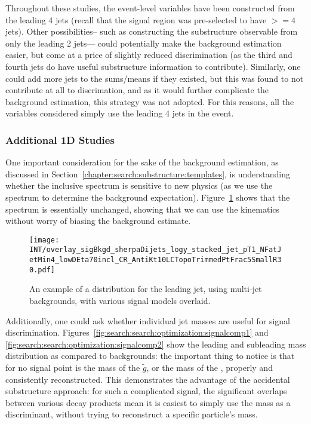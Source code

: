 Throughout these studies, the event-level variables have been constructed from the leading 4 jets (recall that the signal region was pre-selected to have $>=4$ jets). Other possibilities-- such as constructing the substructure observable from only the leading 2 jets--- could potentially make the background estimation easier, but come at a price of slightly reduced discrimination (as the third and fourth jets do have useful substructure information to contribute). Similarly, one could add more jets to the sums/means if they existed, but this was found to not contribute at all to discrimation, and as it would further complicate the background estimation, this strategy was not adopted. For this reasons, all the variables considered simply use the leading 4 jets in the event.

\subsubsection{Additional 1D Studies}

One important consideration for the sake of the background estimation, as discussed in Section~\ref{chapter:search:substructure:templates}, is understanding whether the inclusive \pt spectrum is sensitive to new physics (as we use the \pt spectrum to determine the background expectation). Figure~\ref{fig:search:search:optimization:pt} shows that the \pt spectrum is essentially unchanged, showing that we can use the kinematics without worry of biasing the background estimate.


\begin{figure}
\centering
\texttt{[image: INT/overlay\_sigBkgd\_sherpaDijets\_logy\_stacked\_jet\_pT1\_NFatJetMin4\_lowDEta70incl\_CR\_AntiKt10LCTopoTrimmedPtFrac5SmallR30.pdf]}
\label{fig:search:search:optimization:pt}
\caption{An example of a \pt distribution for the leading jet, using \Sherpa multi-jet backgrounds, with various signal models overlaid.}
\end{figure}



Additionally, one could ask whether individual jet masses are useful for signal discrimination. Figures~\ref{fig:search:search:optimization:signalcomp1} and \ref{fig:search:search:optimization:signalcomp2} show the leading and subleading mass distribution as compared to \Herwigpp backgrounds: the important thing to notice is that for no signal point is the mass of the $\tilde{g}$, or the mass of the \lsp, properly and consistently reconstructed. This demonstrates the advantage of the accidental substructure approach: for such a complicated signal, the significant overlaps between various decay products mean it is easiest to simply use the mass as a discriminant, without trying to reconstruct a specific particle's mass.


